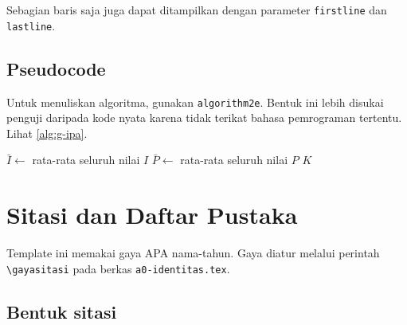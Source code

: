 

Sebagian baris saja juga dapat ditampilkan dengan parameter
\texttt{firstline} dan \texttt{lastline}.



\subsection{Pseudocode}
Untuk menuliskan algoritma, gunakan \texttt{algorithm2e}. Bentuk ini lebih
disukai penguji daripada kode nyata karena tidak terikat bahasa pemrograman
tertentu. Lihat \cref{alg:g-ipa}.

\begin{algorithm}[H]
\caption{Pemetaan kuadran \textit{Importance-Performance Analysis}}
\label{alg:g-ipa}
$\bar{I} \leftarrow$ rata-rata seluruh nilai $I$\;
$\bar{P} \leftarrow$ rata-rata seluruh nilai $P$\;
\Return $K$\;
\end{algorithm}

\section{Sitasi dan Daftar Pustaka}

Template ini memakai gaya APA nama-tahun. Gaya diatur melalui perintah
\texttt{\textbackslash gayasitasi} pada berkas \texttt{a0-identitas.tex}.

\subsection{Bentuk sitasi}

